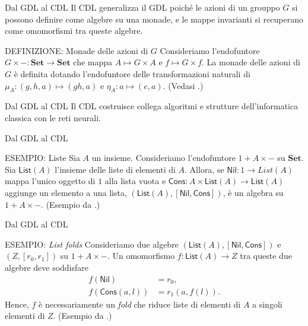\documentclass{beamer}
\begin{document}
\begin{frame}{Dal GDL al CDL}
    Il CDL generalizza il GDL poiché le azioni di un grouppo $G$ si possono definire come algebre su una monade, e le mappe invarianti si recuperano come omomorfismi tra queste algebre.

    \vspace{5mm}

    \begin{block}{DEFINIZIONE: Monade delle azioni di $G$}
        Consideriamo l'endofuntore $G \times -: \mathbf{Set} \to \mathbf{Set}$ che mappa $A \mapsto G \times A$ e $f \mapsto G \times f$.
        La monade delle azioni di $G$ è definita dotando l'endofuntore delle transformazioni naturali di $\mu_A: (g,h,a) \mapsto (gh,a)$ e  $\eta_A: a \mapsto (e,a)$. (Vedasi \cite{gavranovicposition}.)
    \end{block}
\end{frame}

\begin{frame}{Dal GDL al CDL}
    Il CDL costruisce collega algoritmi e strutture dell'informatica classica con le reti neurali.
\end{frame}

\begin{frame}{Dal GDL al CDL}
    \begin{block}{ESEMPIO: Liste}
        Sia $A$ un insieme. Consideriamo l'endofuntore $1 + A \times -$ su $\mathbf{Set}$. Sia $\mathsf{List}(A)$ l'insieme delle liste di elementi di $A$. Allora, se $\mathsf{Nil}: 1 \to {List}(A)$ mappa l'unico oggetto di $1$ alla lista vuota e $\mathsf{Cons}: A \times \mathsf{List}(A) \to \mathsf{List}(A)$ aggiunge un elemento a una lista, $(\mathsf{List}(A), [\mathsf{Nil}, \mathsf{Cons}])$, è un algebra su $1 + A \times -$. (Esempio da \cite{gavranovicposition}.)
    \end{block}
\end{frame}

\begin{frame}{Dal GDL al CDL}
    \begin{block}{ESEMPIO: \textit{List folds}}
        Consideriamo due algebre $(\mathsf{List}(A), [\mathsf{Nil}, \mathsf{Cons}])$ e $(Z, [r_0,r_1])$ su $1 + A \times -$. Un omomorfismo $f: \mathsf{List}(A) \to Z$ tra queste due algebre deve soddisfare 
        \begin{align*}
            f(\mathsf{Nil}) &= r_0,\\
            f(\mathsf{Cons}(a,l)) &= r_1(a,f(l)). 
        \end{align*}
        Hence, $f$ è necessariamente un \textit{fold} che riduce liste di elementi di $A$ a singoli elementi di $Z$. (Esempio da \cite{gavranovicposition}.)
    \end{block}
\end{frame}
\end{document}
